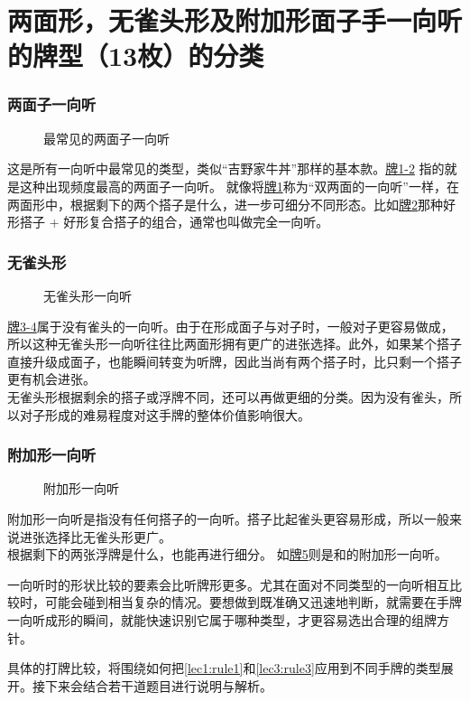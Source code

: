 \chapter[一向听的分类]{两面形，无雀头形及附加形面子手一向听的牌型（13枚）的分类}

\subsection{两面子一向听}
\begin{figure}
    \caption{最常见的两面子一向听}
    \label{lec5:pai1-2}
    \par\bigskip
\end{figure}
这是所有一向听中最常见的类型，类似“吉野家牛丼”那样的基本款。\hyperref[lec5:pai1-2]{牌1-2}
指的就是这种出现频度最高的两面子一向听。
就像将\hyperref[lec5:pai1-2]{牌1}称为“双两面的一向听”一样，在两面形中，根据剩下的两个搭子是什么，进一步可细分不同形态。比如\hyperref[lec5:pai1-2]{牌2}那种好形搭子 + 好形复合搭子的组合，通常也叫做完全一向听。

\subsection{无雀头形}
\begin{figure}
    \caption{无雀头形一向听}
    \label{lec5:pai3-4}
    \par\bigskip
\end{figure}
\hyperref[lec5:pai3-4]{牌3-4}属于没有雀头的一向听。由于在形成面子与对子时，一般对子更容易做成，所以这种无雀头形一向听往往比两面形拥有更广的进张选择。此外，如果某个搭子直接升级成面子，也能瞬间转变为听牌，因此当尚有两个搭子时，比只剩一个搭子更有机会进张。\\
无雀头形根据剩余的搭子或浮牌不同，还可以再做更细的分类。因为没有雀头，所以对子形成的难易程度对这手牌的整体价值影响很大。

\subsection{附加形一向听}
\begin{figure}
    \caption{附加形一向听}
    \label{lec5:pai5}
\end{figure}
附加形一向听是指没有任何搭子的一向听。搭子比起雀头更容易形成，所以一般来说进张选择比无雀头形更广。\\
根据剩下的两张浮牌是什么，也能再进行细分。
如\hyperref[lec5:pai5]{牌5}则是和的附加形一向听。

一向听时的形状比较的要素会比听牌形更多。尤其在面对不同类型的一向听相互比较时，可能会碰到相当复杂的情况。要想做到既准确又迅速地判断，就需要在手牌一向听成形的瞬间，就能快速识别它属于哪种类型，才更容易选出合理的组牌方针。

具体的打牌比较，将围绕如何把\ref{lec1:rule1}和\ref{lec3:rule3}应用到不同手牌的类型展开。接下来会结合若干道题目进行说明与解析。